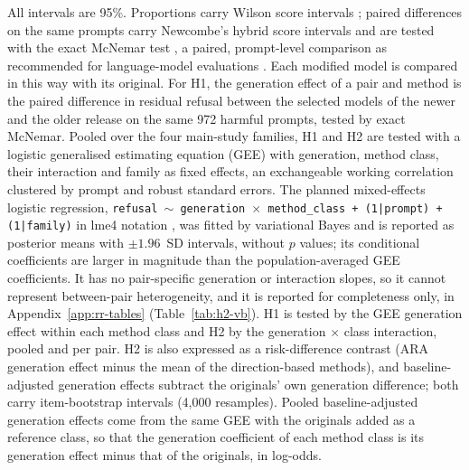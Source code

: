 All intervals are 95\%. Proportions carry Wilson score intervals
\cite{wilson1927probable,brown2001interval}; paired differences on the same prompts
carry Newcombe's hybrid score intervals \cite{newcombe1998improved} and are
tested with the exact McNemar test \cite{mcnemar1947note}, a paired,
prompt-level comparison as recommended for language-model evaluations
\cite{miller2024adding}. Each modified model is compared in this way with its
original. For H1, the generation effect of a pair and method is the paired
difference in residual refusal between the selected models of the newer and
the older release on the same 972 harmful prompts, tested by exact McNemar.
Pooled over the four main-study families, H1 and H2 are tested with a logistic
generalised estimating equation (GEE) \cite{liang1986longitudinal} with
generation, method class, their interaction and family as fixed effects, an
exchangeable working correlation clustered by prompt and robust standard
errors. The planned mixed-effects logistic regression,
\texttt{refusal $\sim$ generation $\times$ method\_class + (1|prompt) + (1|family)}
in lme4 notation \cite{bates2015lme4,baayen2008mixed}, was fitted by
variational Bayes and is reported as posterior means with $\pm 1.96$~SD
intervals, without $p$ values; its conditional coefficients are larger in
magnitude than the population-averaged GEE coefficients. It has no
pair-specific generation or interaction slopes, so it cannot represent
between-pair heterogeneity, and it is reported for completeness only, in
Appendix~\ref{app:rr-tables} (Table~\ref{tab:h2-vb}).
H1 is tested by the GEE
generation effect within each method class and H2 by the generation $\times$
class interaction, pooled and per pair. H2 is also expressed as a
risk-difference contrast (ARA generation effect minus the mean of the
direction-based methods), and baseline-adjusted generation effects subtract
the originals' own generation difference; both carry item-bootstrap intervals
(4,000 resamples). Pooled baseline-adjusted generation effects come from the
same GEE with the originals added as a reference class, so that the
generation coefficient of each method class is its generation effect minus
that of the originals, in log-odds.


